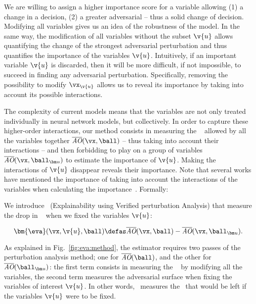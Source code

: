 \subsubsection{\eva}

We are willing to assign a higher importance score for a variable allowing (1) a change in a decision, (2) a greater adversarial -- thus a solid change of decision. Modifying all variables gives us an idea of the robustness of the model.
In the same way, the modification of all variables without the subset $\v{u}$ allows quantifying the change of the strongest adversarial perturbation and thus quantifies the importance of the variables $\v{u}$. Intuitively, if an important variable $\v{u}$ is discarded, then it will be more difficult, if not impossible, to succeed in finding any adversarial perturbation. Specifically, removing the possibility to modify $\vx_{\v{u}}$ allows us to reveal its importance by taking into account its possible interactions.

The complexity of current models means that the variables are not only treated individually in neural network models, but collectively. In order to capture these higher-order interactions, our method consists in measuring the \adv~ allowed by all the variables together $\AOup(\vx, \ball)$ -- thus taking into account their interactions -- and then forbidding to play on a group of variables $\AOup(\vx, \ballu)$ to estimate the importance of $\v{u}$. Making the interactions of $\v{u}$ disappear reveals their importance. Note that several works have mentioned the importance of taking into account the interactions of the variables when calculating the importance~\cite{petsiuk2018rise,fel2021sobol, ferrettini2021coalitional,idrissi2023coalitional}. Formally:

\begin{definition}[\eva]
We introduce \eva~(Explainability using Verified perturbation Analysis) that measure the drop in \adv~ when we fixed the variables $\v{u}$:

\begin{equation}
    \label{eq:eva:tod_estimator}
    \bm{\eva}(\vx, \v{u}, \ball) \defas \AOup(\vx, \ball) - \AOup(\vx, \ballu).
\end{equation}

\end{definition}


As explained in Fig.~\ref{fig:eva:method}, the estimator requires two passes of the perturbation analysis method; one for $\AOup(\ball)$, and the other for $\AOup(\ballu)$: the first term consists in measuring the \adv~ by modifying all the variables, the second term measures the adversarial surface when fixing the variables of interest $\v{u}$.
In other words, \eva~measures the \adv~that would be left if the variables $\v{u}$ were to be fixed.


